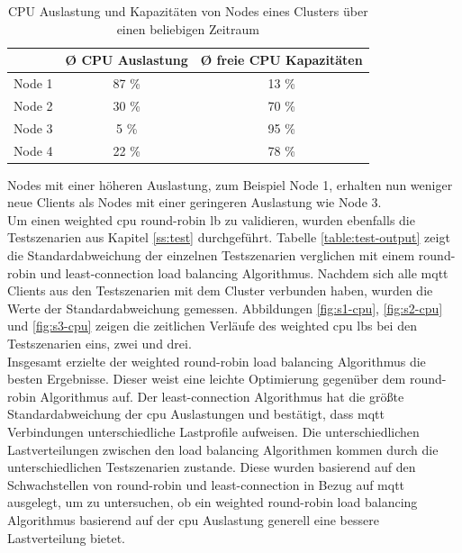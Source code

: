 \begin{table}[h]
\centering
\renewcommand{\arraystretch}{1.5}
\begin{tabular}{|l|c|c|}
    \hline
    & \textbf{Ø CPU Auslastung} & \textbf{Ø freie CPU Kapazitäten} \\
    \hline
    \hline
    Node 1 & 87 \% & 13 \% \\
    \hline
    Node 2 & 30 \% & 70 \% \\
    \hline
    Node 3 & 5 \% & 95 \% \\
    \hline
    Node 4 & 22 \% & 78 \% \\
    \hline
\end{tabular}
\caption{CPU Auslastung und Kapazitäten von Nodes eines Clusters über einen beliebigen Zeitraum}
\label{table:example-cluster-cpu}
\end{table}
Nodes mit einer höheren Auslastung, zum Beispiel Node 1, erhalten nun weniger neue Clients als Nodes mit einer geringeren Auslastung wie Node 3.
\\
Um einen weighted \ac{cpu} round-robin \acl{lb} zu validieren, wurden ebenfalls die Testszenarien aus Kapitel \ref{ss:test} durchgeführt.
Tabelle \ref{table:test-output} zeigt die Standardabweichung der einzelnen Testszenarien verglichen mit einem round-robin und least-connection load balancing Algorithmus.
Nachdem sich alle \ac{mqtt} Clients aus den Testszenarien mit dem Cluster verbunden haben, wurden die Werte der Standardabweichung gemessen.
Abbildungen \ref{fig:s1-cpu}, \ref{fig:s2-cpu} und \ref{fig:s3-cpu} zeigen die zeitlichen Verläufe des weighted \ac{cpu} \aclp{lb} bei den Testszenarien eins, zwei und drei.
\\
Insgesamt erzielte der weighted round-robin load balancing Algorithmus die besten Ergebnisse.
Dieser weist eine leichte Optimierung gegenüber dem round-robin Algorithmus auf. Der least-connection Algorithmus hat die grö{\ss}te Standardabweichung der \ac{cpu} Auslastungen und bestätigt, dass \ac{mqtt} Verbindungen unterschiedliche Lastprofile aufweisen.
Die unterschiedlichen Lastverteilungen zwischen den load balancing Algorithmen kommen durch die unterschiedlichen Testszenarien zustande. Diese wurden basierend auf den Schwachstellen von round-robin und least-connection in Bezug auf \ac{mqtt} ausgelegt, um zu untersuchen, ob ein weighted round-robin load balancing Algorithmus basierend auf der \ac{cpu} Auslastung generell eine bessere Lastverteilung bietet.

